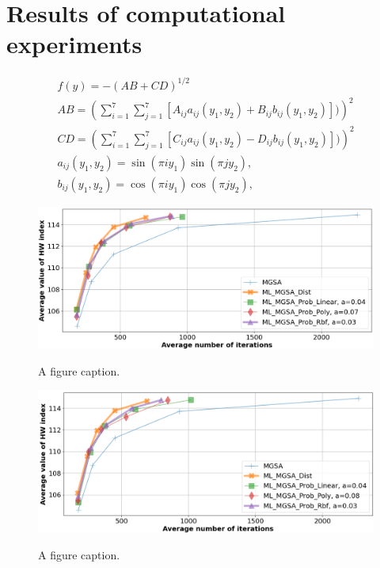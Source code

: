 \documentclass[runningheads]{llncs}
\begin{document}
\section{Results of computational experiments}
\label{sec:5}


\begin{equation}
    \label{eq:19}
		\begin{matrix}
		  f(y)= -(AB + CD)^{1/2} \\
			AB =(\sum_{i=1}^7{\sum_{j=1}^7{[A_{ij} a_{ij} (y_1,y_2) + B_{ij} b_{ij} (y_1,y_2)])}})^2 \\
			CD =(\sum_{i=1}^7{\sum_{j=1}^7{[C_{ij} a_{ij} (y_1,y_2) - D_{ij} b_{ij} (y_1,y_2)])}})^2 \\
			a_{ij} (y_1,y_2) = \sin(\pi i y_1) \sin(\pi j y_2), \\
			b_{ij} (y_1,y_2) = \cos(\pi i y_1) \cos(\pi j y_2),
		\end{matrix}
\end{equation}


\begin{figure}
\includegraphics[width=\textwidth]{fig3.png}
\label{fig3}
\caption{A figure caption.} 
\end{figure}

\begin{figure}
\includegraphics[width=\textwidth]{fig4.png}
\label{fig4}
\caption{A figure caption.} 
\end{figure}
\end{document}
